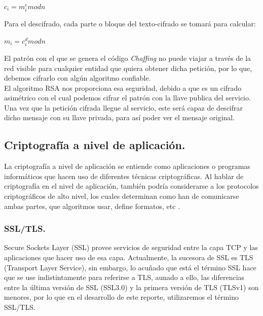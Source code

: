 \documentclass[12pt, a4paper, titlepage]{report}
\begin{document}
		    \begin{center}
		        $c_i=m^{e}_imodn$
		    \end{center}
		    
		    Para el descifrado, cada parte o bloque del texto-cifrado se tomará para calcular:
		    
		    \begin{center}
		        $m_i=c^{d}_imodn$
		    \end{center}
		    
		    El patrón con el que se genera el código \textit{Chaffing} no puede viajar a través de la red visible para cualquier entidad que quiera obtener dicha petición, por lo que, debemos cifrarlo con algún algoritmo confiable.\\
		    El algoritmo RSA nos proporciona esa seguridad, debido a que es un cifrado asimétrico con el cual podemos cifrar el patrón con la llave publica del servicio. Una vez que la petición cifrada llegue al servicio, este será capaz de descifrar dicho mensaje con su llave privada, para así poder ver el mensaje original.\\
        		
	    
            
            \subsection{Criptografía a nivel de aplicación.}
                La criptografía a nivel de aplicación se entiende como aplicaciones o programas informáticos que hacen uso de diferentes técnicas criptográficas. Al hablar de criptografía en el nivel de aplicación, también podría considerarse a los protocolos criptográficos de alto nivel, los cuales determinan como han de comunicarse ambas partes, que algoritmos usar, define formatos, etc \cite{refCriptografia}.
                
                \subsubsection{SSL/TLS.}
                Secure Sockets Layer (SSL) provee servicios de seguridad entre la capa TCP y las aplicaciones que hacer uso de esa capa. Actualmente, la sucesora de SSL es TLS (Transport Layer Service), sin embargo, lo acuñado que está el término SSL hace que se use indistintamente para referirse a TLS, aunado a ello, las diferencias entre la última versión de SSL (SSL3.0) y la primera versión de TLS (TLSv1) son menores, por lo que en el desarrollo de este reporte, utilizaremos el término SSL/TLS.\\
                
\end{document}
